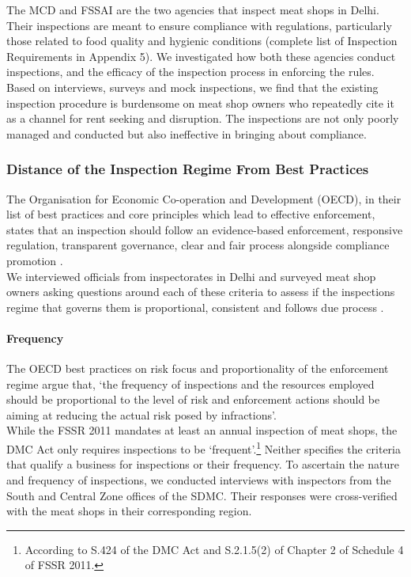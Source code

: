 \documentclass[a4paper, 12pt]{article}
\begin{document}
The MCD and FSSAI are the two agencies that inspect meat shops in Delhi. Their inspections are meant to ensure compliance with regulations, particularly those related to food quality and hygienic conditions (complete list of Inspection Requirements in Appendix 5). We investigated how both these agencies conduct inspections, and the efficacy of the inspection process in enforcing the rules. Based on interviews, surveys and mock inspections, we find that the existing inspection procedure is burdensome on meat shop owners who repeatedly cite it as a channel for rent seeking and disruption. The inspections are not only poorly managed and conducted but also ineffective in bringing about compliance. \\

\subsubsection{Distance of the Inspection Regime From Best Practices}

The Organisation for Economic Co-operation and Development (OECD), in their list of best practices and core principles which lead to effective enforcement, states that an inspection should follow an evidence-based enforcement, responsive regulation, transparent governance, clear and fair process alongside compliance promotion \parencite{oecd1report}. \\

We interviewed officials from inspectorates in Delhi and surveyed meat shop owners asking questions around each of these criteria to assess if the inspections regime that governs them is proportional, consistent and follows due process \parencite{oecd1report}. 

\paragraph{Frequency}
The OECD best practices on risk focus and proportionality of the enforcement regime argue that, ‘the frequency of inspections and the resources employed should be proportional to the level of risk and enforcement actions should be aiming at reducing the actual risk posed by infractions’. \\

While the FSSR 2011 mandates at least an annual inspection of meat shops, the DMC Act only requires inspections to be ‘frequent’.\footnote{According to S.424 of the DMC Act and S.2.1.5(2) of Chapter 2 of Schedule 4 of FSSR 2011.} Neither specifies the criteria that qualify a business for inspections or their frequency. To ascertain the nature and frequency of inspections, we conducted interviews with inspectors from the South and Central Zone offices of the SDMC. Their responses were cross-verified with the meat shops in their corresponding region. \\
\end{document}

